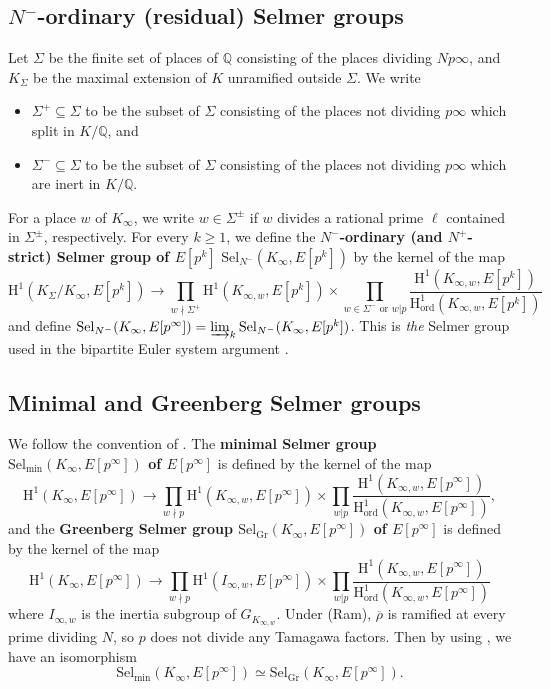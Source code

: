 \documentclass[11pt]{amsart}
\numberwithin{equation}{section}
\theoremstyle{definition}
\begin{document}
\subsection{$N^-$-ordinary (residual) Selmer groups}
Let $\Sigma$ be the finite set of places of $\mathbb{Q}$ consisting of the places dividing $Np\infty$, and $K_\Sigma$ be the maximal extension of $K$ unramified outside $\Sigma$.
We write 
\begin{itemize}
\item $\Sigma^+ \subseteq \Sigma$
to be the subset of $\Sigma$ consisting of the places not dividing $p\infty$ which split in $K/\mathbb{Q}$, and
\item $\Sigma^- \subseteq \Sigma$
to be the subset of $\Sigma$ consisting of the places not dividing $p\infty$ which are inert in $K/\mathbb{Q}$.
\end{itemize}
For a place $w$ of $K_\infty$, we write $w \in \Sigma^{\pm}$ if $w$ divides a rational prime $\ell$ contained in $\Sigma^{\pm}$, respectively.
For every $k \geq 1$, we define the \textbf{$N^-$-ordinary (and $N^+$-strict) Selmer group of $E[p^k]$} 
$\mathrm{Sel}_{N^-}(K_\infty, E[p^k])$
by the kernel of the map
$$\mathrm{H}^1(K_\Sigma/ K_\infty, E[p^k]) \to \prod_{w \nmid \Sigma^+} \mathrm{H}^1(K_{\infty, w}, E[p^k]) \times \prod_{w \in \Sigma^- \textrm{ or } w \vert p} \dfrac{\mathrm{H}^1(K_{\infty,w}, E[p^k])}{\mathrm{H}^1_{\mathrm{ord}}(K_{\infty,w}, E[p^k])}$$ 
and define
$\mathrm{Sel}_{N^-}(K_\infty, E[p^\infty]) = \varinjlim_k \mathrm{Sel}_{N^-}(K_\infty, E[p^k])$.
This is \emph{the} Selmer group used in the bipartite Euler system argument \cite[Def. 2.8]{bertolini-darmon-imc-2005}.


\subsection{Minimal and Greenberg Selmer groups}
We follow the convention of \cite[\S3.1]{pw-mu}.
The \textbf{minimal Selmer group $\mathrm{Sel}_{\mathrm{min}}(K_\infty, E[p^\infty])$ of $E[p^\infty]$} is defined by the kernel of the map
$$\mathrm{H}^1(K_\infty, E[p^\infty]) \to \prod_{w \nmid p} \mathrm{H}^1(K_{\infty, w}, E[p^\infty]) \times \prod_{w \vert p} \dfrac{\mathrm{H}^1(K_{\infty,w}, E[p^\infty])}{\mathrm{H}^1_{\mathrm{ord}}(K_{\infty,w}, E[p^\infty])},$$
and the \textbf{Greenberg Selmer group $\mathrm{Sel}_{\mathrm{Gr}}(K_\infty, E[p^\infty])$ of $E[p^\infty]$} is defined by the kernel of the map
$$\mathrm{H}^1(K_\infty, E[p^\infty]) \to \prod_{w \nmid p} \mathrm{H}^1(I_{\infty, w}, E[p^\infty]) \times 
\prod_{w \vert p} \dfrac{\mathrm{H}^1(K_{\infty,w}, E[p^\infty])}{\mathrm{H}^1_{\mathrm{ord}}(K_{\infty,w}, E[p^\infty])}$$
where $I_{\infty, w}$ is the inertia subgroup of $G_{K_{\infty,w}}$.
Under (Ram), $\overline{\rho}$ is ramified at every prime dividing $N$, so $p$ does not divide any Tamagawa factors.
Then by using \cite[Lem. 3.4]{pw-mu}, we have an isomorphism
\begin{equation} \label{eqn:minimal-greenberg}
\mathrm{Sel}_{\mathrm{min}}(K_\infty, E[p^\infty]) \simeq \mathrm{Sel}_{\mathrm{Gr}}(K_\infty, E[p^\infty]).
\end{equation}
\end{document}
